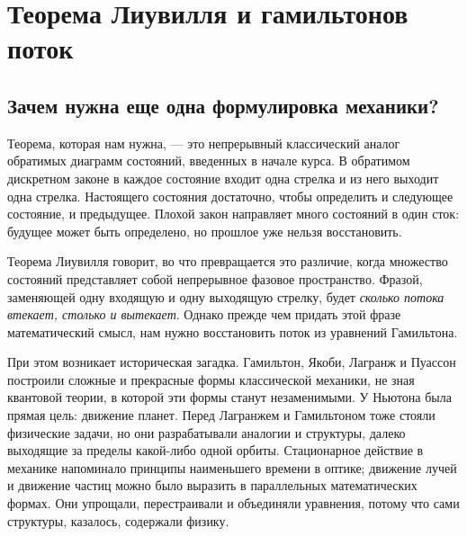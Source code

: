 \chapter{Теорема Лиувилля и гамильтонов поток}


\section{Зачем нужна еще одна формулировка механики?}

Теорема, которая нам нужна, — это непрерывный классический аналог обратимых диаграмм состояний, введенных в начале курса. В обратимом дискретном законе в каждое состояние входит одна стрелка и из него выходит одна стрелка. Настоящего состояния достаточно, чтобы определить и следующее состояние, и предыдущее. Плохой закон направляет много состояний в один сток: будущее может быть определено, но прошлое уже нельзя восстановить.

Теорема Лиувилля говорит, во что превращается это различие, когда множество состояний представляет собой непрерывное фазовое пространство. Фразой, заменяющей одну входящую и одну выходящую стрелку, будет \emph{сколько потока втекает, столько и вытекает}. Однако прежде чем придать этой фразе математический смысл, нам нужно восстановить поток из уравнений Гамильтона.

При этом возникает историческая загадка. Гамильтон, Якоби, Лагранж и Пуассон построили сложные и прекрасные формы классической механики, не зная квантовой теории, в которой эти формы станут незаменимыми. У Ньютона была прямая цель: движение планет. Перед Лагранжем и Гамильтоном тоже стояли физические задачи, но они разрабатывали аналогии и структуры, далеко выходящие за пределы какой-либо одной орбиты. Стационарное действие в механике напоминало принципы наименьшего времени в оптике; движение лучей и движение частиц можно было выразить в параллельных математических формах. Они упрощали, перестраивали и объединяли уравнения, потому что сами структуры, казалось, содержали физику.

